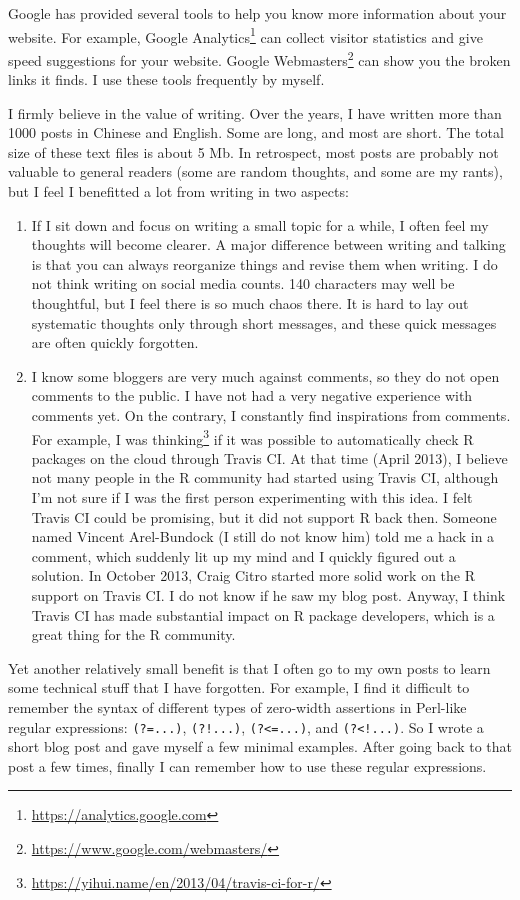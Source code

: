 \documentclass[12pt,]{krantz}
\renewcommand{\href}[2]{#2\footnote{\url{#1}}}
\theoremstyle{definition}
\theoremstyle{definition}
\theoremstyle{definition}
\theoremstyle{remark}
\begin{document}
Google has provided several tools to help you know more information
about your website. For example,
\href{https://analytics.google.com}{Google Analytics} can collect
visitor statistics and give speed suggestions for your website.
\href{https://www.google.com/webmasters/}{Google Webmasters} can show
you the broken links it finds. I use these tools frequently by myself.

I firmly believe in the value of writing. Over the years, I have written
more than 1000 posts in Chinese and English. Some are long, and most are
short. The total size of these text files is about 5 Mb. In retrospect,
most posts are probably not valuable to general readers (some are random
thoughts, and some are my rants), but I feel I benefitted a lot from
writing in two aspects:

\begin{enumerate}
\def\labelenumi{\arabic{enumi}.}
\item
  If I sit down and focus on writing a small topic for a while, I often
  feel my thoughts will become clearer. A major difference between
  writing and talking is that you can always reorganize things and
  revise them when writing. I do not think writing on social media
  counts. 140 characters may well be thoughtful, but I feel there is so
  much chaos there. It is hard to lay out systematic thoughts only
  through short messages, and these quick messages are often quickly
  forgotten.
\item
  I know some bloggers are very much against comments, so they do not
  open comments to the public. I have not had a very negative experience
  with comments yet. On the contrary, I constantly find inspirations
  from comments. For example,
  \href{https://yihui.name/en/2013/04/travis-ci-for-r/}{I was thinking}
  if it was possible to automatically check R packages on the cloud
  through Travis CI. At that time (April 2013), I believe not many
  people in the R community had started using Travis CI, although I'm
  not sure if I was the first person experimenting with this idea. I
  felt Travis CI could be promising, but it did not support R back then.
  Someone named Vincent Arel-Bundock (I still do not know him) told me a
  hack in a comment, which suddenly lit up my mind and I quickly figured
  out a solution. In October 2013, Craig Citro started more solid work
  on the R support on Travis CI. I do not know if he saw my blog post.
  Anyway, I think Travis CI has made substantial impact on R package
  developers, which is a great thing for the R community.
\end{enumerate}

Yet another relatively small benefit is that I often go to my own posts
to learn some technical stuff that I have forgotten. For example, I find
it difficult to remember the syntax of different types of zero-width
assertions in Perl-like regular expressions: \texttt{(?=...)},
\texttt{(?!...)}, \texttt{(?\textless{}=...)}, and
\texttt{(?\textless{}!...)}. So I wrote a short blog post and gave
myself a few minimal examples. After going back to that post a few
times, finally I can remember how to use these regular expressions.



\backmatter
\printindex
\end{document}
